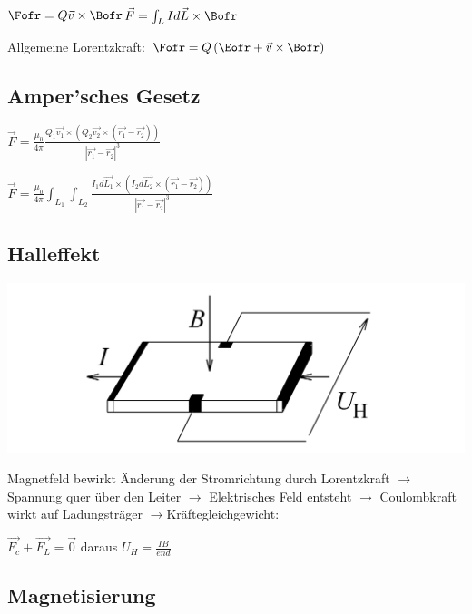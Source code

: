 \documentclass[10pt,a4paper]{scrartcl}
\begin{document}
\begin{multicols*}{3}
	$\Fofr=Q\vec{v}\times\Bofr$\hfill$\vec{F}=\int_L{Id\vec{L}\times\Bofr}$
	
	Allgemeine Lorentzkraft: $\Fofr=Q\left(\Eofr+\vec{v}\times\Bofr\right)$
	
	\subsection{Amper'sches Gesetz}
	
	$\vec{F}=\frac{\mu_0}{4\pi}\frac{Q_1\vec{v_1}\times(Q_2\vec{v_2}\times(\vec{r_1}-\vec{r_2}))}{|\vec{r_1}-\vec{r_2}|^3}$
	
	$\vec{F}=\frac{\mu_0}{4\pi}\int_{L_1}{\int_{L_2}{\frac{I_1d\vec{L_1}\times(I_2d\vec{L_2}\times(\vec{r_1}-\vec{r_2}))}{|\vec{r_1}-\vec{r_2}|^3}}}$	
	
	\subsection{Halleffekt}
	
	\includegraphics[width=\linewidth]{Halleffekt}
	
	Magnetfeld bewirkt Änderung der Stromrichtung durch Lorentzkraft $\rightarrow$ Spannung quer über den Leiter $\rightarrow$ Elektrisches Feld entsteht $\rightarrow$ Coulombkraft wirkt auf Ladungsträger $\rightarrow$Kräftegleichgewicht:
	
	$\vec{F_c}+\vec{F_L}=\vec{0}$ \hfill daraus \hfill $U_H=\frac{IB}{end}$ 	
	
	\subsection{Magnetisierung}
	
	

\end{multicols*}
\end{document}
